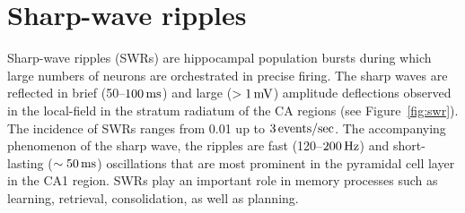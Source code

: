 \begin{comment}


\end{comment}

\section{Sharp-wave ripples}
\label{sec:swr}
  Sharp-wave ripples (SWRs) are hippocampal population bursts during which
  large numbers of neurons are orchestrated in precise firing. The sharp waves
  are reflected in brief (50--$100 \rm\,ms$) and large ($>1 \rm\, mV$)
  amplitude deflections observed in the local-field in the stratum radiatum of
  the CA regions (see Figure~\ref{fig:swr}). The incidence of SWRs ranges from
  0.01 up to $3 \rm \, events/sec$. The accompanying phenomenon of the sharp
  wave, the ripples are fast (120--$200 \rm\, Hz$) and short-lasting ($\sim
  50\, \rm ms$) oscillations that are most prominent in the pyramidal cell
  layer in the CA1 region. SWRs play an important role in memory processes such
  as learning, retrieval, consolidation, as well as planning.

